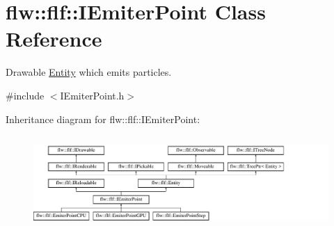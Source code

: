 \hypertarget{classflw_1_1flf_1_1IEmiterPoint}{}\section{flw\+:\+:flf\+:\+:I\+Emiter\+Point Class Reference}
\label{classflw_1_1flf_1_1IEmiterPoint}


Drawable \hyperlink{classflw_1_1flf_1_1Entity}{Entity} which emits particles.  




{\ttfamily \#include $<$I\+Emiter\+Point.\+h$>$}

Inheritance diagram for flw\+:\+:flf\+:\+:I\+Emiter\+Point\+:\begin{figure}[H]
\begin{center}
\leavevmode
\includegraphics[height=3.589744cm]{classflw_1_1flf_1_1IEmiterPoint}
\end{center}
\end{figure}
